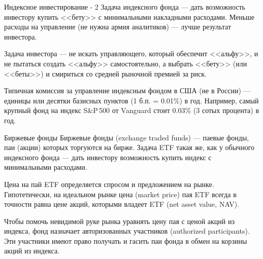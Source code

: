 \documentclass{beamer}
\begin{document}
\begin{frame}{Индексное инвестирование - 2}
\justify
Задача индексного фонда --- дать возможность инвестору купить <<бету>> с 
минимальными накладными расходами. Меньше расходы на управление (не нужна армия 
аналитиков) --- лучше результат инвестора.

\justify
Задача инвестора --- не искать управляющего, который обеспечит <<альфу>>, и не 
пытаться создать <<альфу>> самостоятельно, а выбрать <<бету>> (или <<беты>>) и 
смириться со средней рыночной премией за риск.

\justify
Типичная комиссия за управление индексным фондом в США (не в России) --- 
единицы или десятки базисных пунктов (1 б.п. = 0.01\%) в год. Например, самый 
крупный фонд на индекс S\&P\,500 от Vanguard стоит 0.03\% (3 сотых процента) в 
год.
\end{frame}



\begin{frame}{Биржевые фонды}
\justify
Биржевые фонды (exchange traded funds) --- паевые фонды, паи (акции) которых 
торгуются на бирже. Задача ETF такая же, как у обычного индексного фонда --- 
дать инвестору возможность купить индекс с минимальными расходами.

\justify
Цена на пай ETF определяется спросом и предложением на рынке. Гипотетически, на 
идеальном рынке цена (market price) пая ETF всегда в точности равна цене акций, 
которыми владеет ETF (net asset value, NAV).

\justify
Чтобы помочь невидимой руке рынка уравнять цену пая с ценой акций из индекса, 
фонд назначает авторизованных участников (authorized participants). Эти 
участники имеют право получать и гасить паи фонда в обмен на корзины акций из 
индекса.
\end{frame}
\end{document}

